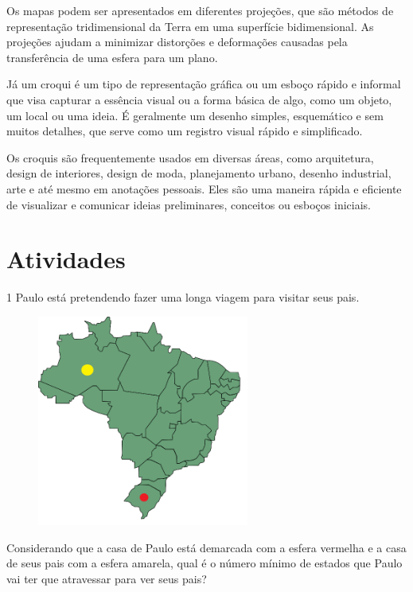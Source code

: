 {{{{Os mapas podem ser apresentados em diferentes projeções, que são métodos
de representação tridimensional da Terra em uma superfície
bidimensional. As projeções ajudam a minimizar distorções e deformações
causadas pela transferência de uma esfera para um plano.

Já um croqui é um tipo de representação gráfica ou um esboço rápido e informal
que visa capturar a essência visual ou a forma básica de algo, como um
objeto, um local ou uma ideia. É geralmente um desenho simples,
esquemático e sem muitos detalhes, que serve como um registro visual
rápido e simplificado.

Os croquis são frequentemente usados em diversas áreas, como
arquitetura, design de interiores, design de moda, planejamento urbano,
desenho industrial, arte e até mesmo em anotações pessoais. Eles são uma
maneira rápida e eficiente de visualizar e comunicar ideias
preliminares, conceitos ou esboços iniciais.}

\section*{Atividades}

\num{1} Paulo está pretendendo fazer uma longa viagem para visitar seus pais.

\begin{figure}[H]
\centering\includegraphics[width=2.73952in]{./imgSAEB_8_MAT/media/image36.png}
\end{figure}


Considerando que a casa de Paulo está demarcada com a esfera vermelha e
a casa de seus pais com a esfera amarela, qual é o número mínimo de
estados que Paulo vai ter que atravessar para ver seus pais?

}}}
